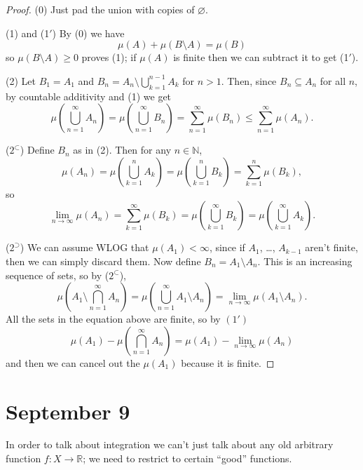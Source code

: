 \documentclass[11pt]{scrartcl}
\providecommand{\NN}{\mathbb N}
\providecommand{\RR}{\mathbb R}
\begin{document}
\begin{proof}
    (0) Just pad the union with copies of $\varnothing$.

    (1) and (1$'$) By (0) we have
    \begin{equation*}
        \mu(A) + \mu(B\setminus A) = \mu(B)
    \end{equation*}
    so $\mu(B\setminus A) \ge 0$ proves (1);
    if $\mu(A)$ is finite then we can subtract it to get (1$'$).

    (2) Let $B_1 = A_1$ and $B_n = A_n\setminus\bigcup_{k=1}^{n-1}A_k$ for $n>1$.
    Then, since $B_n\subseteq A_n$ for all $n$,
    by countable additivity and (1) we get
    \begin{equation*}
	\mu\left(\bigcup_{n=1}^\infty A_n\right) =
	\mu\left(\bigcup_{n=1}^\infty B_n\right) =
	\sum_{n=1}^\infty \mu(B_n) \le \sum_{n=1}^\infty \mu(A_n).
    \end{equation*}

    ($2^\subset$) Define $B_n$ as in (2). Then for any $n\in\NN$,
    \begin{equation*}
	\mu(A_n) =
	\mu\left(\bigcup_{k=1}^n A_k\right) = \mu\left(\bigcup_{k=1}^n B_k\right)
	= \sum_{k=1}^n \mu(B_k),
    \end{equation*}
    so
    \begin{equation*}
	\lim_{n\to\infty}\mu(A_n) = \sum_{k=1}^\infty \mu(B_k)
	= \mu\left(\bigcup_{k=1}^\infty B_k\right)
	= \mu\left(\bigcup_{k=1}^\infty A_k\right).
    \end{equation*}

    ($2^\supset$) We can assume WLOG that $\mu(A_1) < \infty$,
    since if $A_1$, \dots, $A_{k-1}$ aren't finite, then
    we can simply discard them. Now define $B_n = A_1\setminus A_n$.
    This is an increasing sequence of sets, so by ($2^\subset$),
    \begin{equation*}
	\mu\left(A_1\setminus \bigcap_{n=1}^\infty A_n\right) =
	\mu\left(\bigcup_{n=1}^\infty A_1\setminus A_n\right) =
	\lim_{n\to\infty} \mu(A_1\setminus A_n).
    \end{equation*}
    All the sets in the equation above are finite, so by $(1')$
    \begin{equation*}
	\mu(A_1) - \mu\left(\bigcap_{n=1}^\infty A_n\right)
	= \mu(A_1) - \lim_{n\to\infty} \mu(A_n)
    \end{equation*}
    and then we can cancel out the $\mu(A_1)$ because it is finite.
\end{proof}

\section{September 9}\label{sec:sep9}
In order to talk about integration we can't just talk about
any old arbitrary function $f\colon X\to\RR$; we need to restrict
to certain ``good'' functions.
\end{document}

